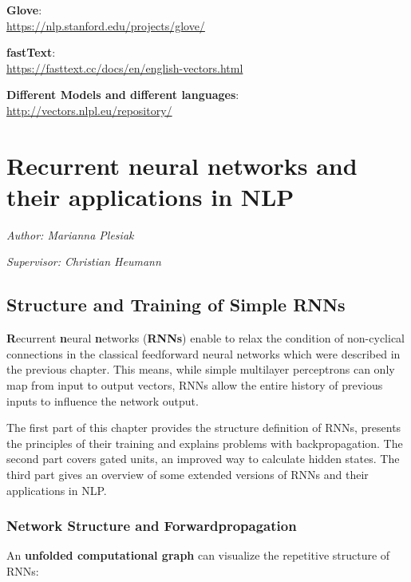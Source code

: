 \documentclass[]{krantz}
\begin{document}
\textbf{Glove}:\\
\url{https://nlp.stanford.edu/projects/glove/}

\textbf{fastText}:\\
\url{https://fasttext.cc/docs/en/english-vectors.html}

\textbf{Different Models and different languages}:\\
\url{http://vectors.nlpl.eu/repository/}

\hypertarget{recurrent-neural-networks-and-their-applications-in-nlp}{%
\chapter{Recurrent neural networks and their applications in NLP}\label{recurrent-neural-networks-and-their-applications-in-nlp}}

\emph{Author: Marianna Plesiak}

\emph{Supervisor: Christian Heumann}

\hypertarget{structure-and-training-of-simple-rnns}{%
\section{Structure and Training of Simple RNNs}\label{structure-and-training-of-simple-rnns}}

\textbf{R}ecurrent \textbf{n}eural \textbf{n}etworks (\textbf{RNNs}) enable to relax the condition of non-cyclical connections in the classical feedforward neural networks which were described in the previous chapter. This means, while simple multilayer perceptrons can only map from input to output vectors, RNNs allow the entire history of previous inputs to influence the network output. \citep{graves2013generating}

The first part of this chapter provides the structure definition of RNNs, presents the principles of their training and explains problems with backpropagation. The second part covers gated units, an improved way to calculate hidden states. The third part gives an overview of some extended versions of RNNs and their applications in NLP.

\hypertarget{network-structure-and-forwardpropagation}{%
\subsection{Network Structure and Forwardpropagation}\label{network-structure-and-forwardpropagation}}

An \textbf{unfolded computational graph} can visualize the repetitive structure of RNNs:
\end{document}
